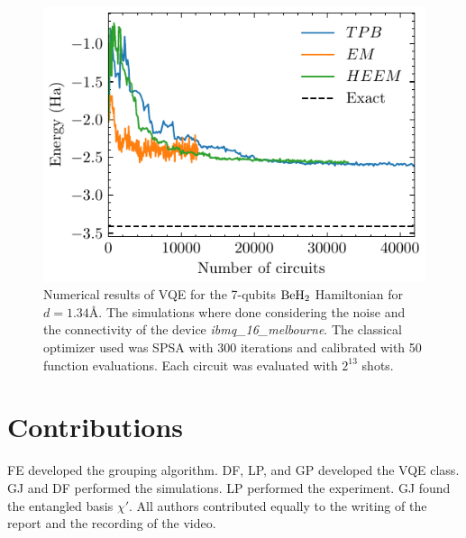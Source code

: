 \documentclass[11pt, twocolumn]{article}
\begin{document}
\begin{figure}[H]
    \centering
    \includegraphics[width=0.95\linewidth]{simulation_BeH.pdf}
    \caption{ Numerical results of VQE for the 7-qubits ${\rm BeH_2}$ Hamiltonian for $d=1.34$\r{A}. The simulations where done considering the noise and the connectivity of the device \emph{ibmq\_16\_melbourne}. The classical optimizer used was SPSA with 300 iterations and calibrated with 50 function evaluations. Each circuit was evaluated with $2^{13}$ shots.}
    \label{fig:simulation}
\end{figure}

\section{Contributions}
FE developed the grouping algorithm. DF, LP, and GP developed the VQE class. GJ and DF performed the simulations. LP performed the experiment. GJ found the entangled basis $\chi'$. All authors contributed equally to the writing of the report and the recording of the video. 



\end{document}
